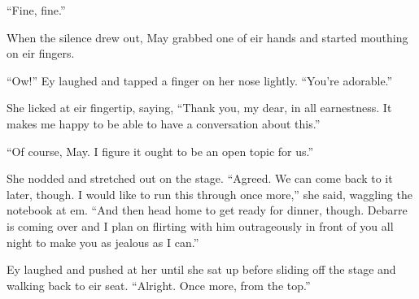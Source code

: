 ``Fine, fine.''

When the silence drew out, May grabbed one of eir hands and started mouthing on eir fingers.

``Ow!'' Ey laughed and tapped a finger on her nose lightly. ``You're adorable.''

She licked at eir fingertip, saying, ``Thank you, my dear, in all earnestness. It makes me happy to be able to have a conversation about this.''

``Of course, May. I figure it ought to be an open topic for us.''

She nodded and stretched out on the stage. ``Agreed. We can come back to it later, though. I would like to run this through once more,'' she said, waggling the notebook at em. ``And then head home to get ready for dinner, though. Debarre is coming over and I plan on flirting with him outrageously in front of you all night to make you as jealous as I can.''

Ey laughed and pushed at her until she sat up before sliding off the stage and walking back to eir seat. ``Alright. Once more, from the top.''
